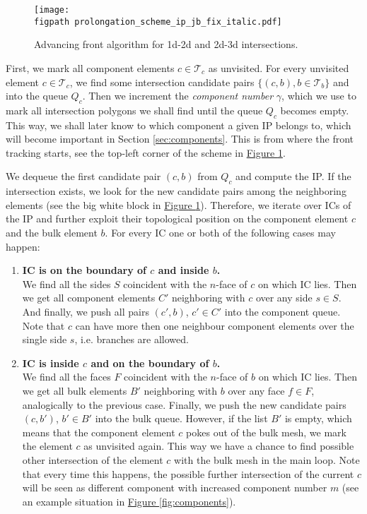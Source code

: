 \documentclass{elsarticle}
\newcommand{\fig}[1]{\hyperref[#1]{Figure \ref{#1}}}
\newcommand{\figpath}{figures/}
\newcommand{\nface}{$n$-face }
\begin{document}
%
\begin{figure}[!htb]
  \centering    
    \texttt{[image: \\figpath prolongation\_scheme\_ip\_jb\_fix\_italic.pdf]}
  \caption{Advancing front algorithm for 1d-2d and 2d-3d intersections.}
  \label{fig:prolongation}
\end{figure}

First, we mark all component elements $c\in\mathcal T_c$ as unvisited. 
For every unvisited element $c\in \mathcal T_c$, 
we find some intersection candidate pairs $\{(c,b), b\in\mathcal T_b\}$ and
into the queue $Q_c$.
Then we increment the \emph{component number} $\gamma$, which we use to 
mark all intersection polygons we shall find until the queue $Q_c$ becomes empty.
This way, we shall later know to which component a given IP belongs to, 
which will become important in Section \ref{sec:components}.
This is from where the front tracking starts, see the top-left corner of the scheme in 
\fig{fig:prolongation}.

We dequeue the first candidate pair $(c,b)$ from $Q_c$ and compute the IP.
If the intersection exists, we look for the new candidate pairs among the neighboring elements
(see the big white block in \fig{fig:prolongation}).
Therefore, we iterate over ICs of the IP and further exploit their topological position on the component element $c$ and the bulk element $b$.
For every IC one or both of the following cases may happen:
\begin{enumerate}[label=(\alph*)]
    \item \textbf{IC is on the boundary of $c$  and inside $b$.} \\
            We find all the sides $S$ coincident with the \nface of $c$ on which IC lies. Then we get all component
            elements $C'$ neighboring with $c$ over any side $s\in S$. And finally, we push all pairs $(c',b)$, $c'\in C'$ 
            into the component queue. Note that $c$ can have more then one neighbour component elements over the single side $s$, i.e. branches are allowed.
    \item \textbf{IC is inside $c$ and on the boundary of $b$.} \label{enum:prolong2}\\
            We find all the faces $F$ coincident with the \nface of $b$ on which IC lies. 
            Then we get all bulk elements $B'$ neighboring with $b$ over any face $f\in F$,
            analogically to the previous case.
            Finally, we push the new candidate pairs $(c, b')$, $b'\in B'$ into the bulk queue.
            However, if the list $B'$ is empty, which means that the component element $c$ pokes out of the bulk mesh,
            we mark the element $c$ as unvisited again. This way we have a chance to find possible other intersection of the element
            $c$ with the bulk mesh in the main loop. Note that every time this happens, the possible further intersection 
            of the current $c$ will be seen as different component with increased component number $m$
            (see an example situation in \fig{fig:components}). 
\end{enumerate}
\end{document}
